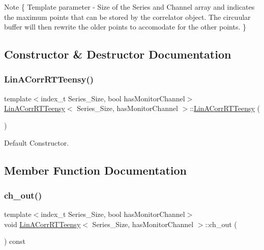 \begin{DoxyNote}{Note}
\{ Template parameter -\/ Size of the Series and Channel array and indicates the maximum points that can be stored by the correlator object. The circuular buffer will then rewrite the older points to accomodate for the other points. \} 
\end{DoxyNote}


\subsection{Constructor \& Destructor Documentation}
\mbox{\label{classLinACorrRTTeensy_aebb83829899235fe5177de735a5367da}} 
\subsubsection{\texorpdfstring{Lin\+A\+Corr\+R\+T\+Teensy()}{LinACorrRTTeensy()}}
{\footnotesize\ttfamily template$<$index\+\_\+t Series\+\_\+\+Size, bool has\+Monitor\+Channel$>$ \\
\hyperlink{classLinACorrRTTeensy}{Lin\+A\+Corr\+R\+T\+Teensy}$<$ Series\+\_\+\+Size, has\+Monitor\+Channel $>$\+::\hyperlink{classLinACorrRTTeensy}{Lin\+A\+Corr\+R\+T\+Teensy} (\begin{DoxyParamCaption}{ }\end{DoxyParamCaption})\hspace{0.3cm}{\ttfamily [inline]}}



Default Constructor. 



\subsection{Member Function Documentation}
\mbox{\label{classLinACorrRTTeensy_a967f1b3ea7e6ebdae8c9bf7c2c641e49}} 
\subsubsection{\texorpdfstring{ch\+\_\+out()}{ch\_out()}}
{\footnotesize\ttfamily template$<$index\+\_\+t Series\+\_\+\+Size, bool has\+Monitor\+Channel$>$ \\
void \hyperlink{classLinACorrRTTeensy}{Lin\+A\+Corr\+R\+T\+Teensy}$<$ Series\+\_\+\+Size, has\+Monitor\+Channel $>$\+::ch\+\_\+out (\begin{DoxyParamCaption}{ }\end{DoxyParamCaption}) const\hspace{0.3cm}{\ttfamily [inline]}}



